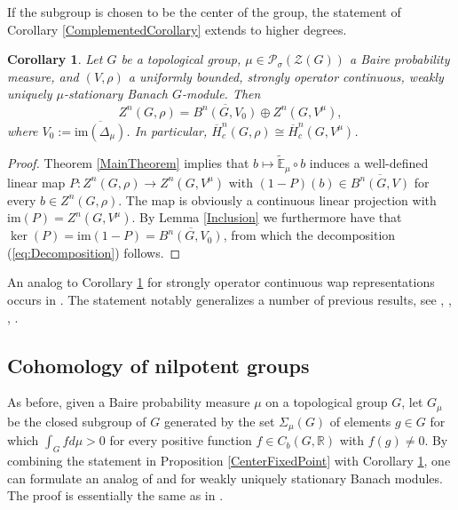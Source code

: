 \documentclass[a4paper,11pt,reqno]{amsart}
\numberwithin{equation}{section}
\newtheorem{corollary}[theorem]{Corollary}
\theoremstyle{definition}
\theoremstyle{remark}
\theoremstyle{remark}
\begin{document}
If the subgroup is chosen to be the center of the group, the statement of Corollary \ref{ComplementedCorollary} extends to higher degrees.

\begin{corollary} \label{AbelianComplementedCorollary} Let $G$ be a topological group, $\mu\in\mathcal{P}_{\sigma}(\mathcal{Z}(G))$ a Baire probability measure, and $(V,\rho)$ a uniformly bounded, strongly operator continuous, weakly uniquely $\mu$-stationary Banach $G$-module. Then 
\begin{equation}
Z^{n}(G,\rho)=\overline{B^{n}(G,V_{0})}\oplus Z^{n}(G,V^{\mu}),\label{eq:Decomposition}
\end{equation}
where \emph{$V_{0}:=\overline{\text{im}(\Delta_{\mu})}$}. In particular, $\overline{H}_{c}^{n}(G,\rho)\cong\overline{H}_{c}^{n}(G,V^{\mu})$. \end{corollary}

\begin{proof} Theorem \ref{MainTheorem} implies that $b\mapsto\widetilde{\mathbb{E}}_{\mu}\circ b$ induces a well-defined linear map $P:Z^{n}(G,\rho)\rightarrow Z^{n}(G,V^{\mu})$ with $(1-P)(b)\in\overline{B^{n}(G,V)}$ for every $b\in Z^{n}(G,\rho)$. The map is obviously a continuous linear projection with $\text{im}(P)=Z^{n}(G,V^{\mu})$. By Lemma \ref{Inclusion} we furthermore have that $\ker(P)=\text{im}(1-P)=\overline{B^{n}(G,V_{0})}$, from which the decomposition (\ref{eq:Decomposition}) follows. \end{proof}

An analog to Corollary \ref{AbelianComplementedCorollary} for strongly operator continuous wap representations occurs in \cite[Corollary 5]{BaderRosendalSauer}. The statement notably generalizes a number of previous results, see \cite{Puls03}, \cite{MartinValette07}, \cite{Kappos05}, \cite{Nowak13}.

\vspace{3mm}


\subsection{Cohomology of nilpotent groups}

As before, given a Baire probability measure $\mu$ on a topological group $G$, let $G_{\mu}$ be the closed subgroup of $G$ generated by the set $\Sigma_{\mu}(G)$ of elements $g\in G$ for which $\int_{G}fd\mu>0$ for every positive function $f\in C_{b}(G,\mathbb{R})$ with $f(g)\neq0$. By combining the statement in Proposition \ref{CenterFixedPoint} with Corollary \ref{AbelianComplementedCorollary}, one can formulate an analog of \cite[Corollary 3.7]{Shalom00} and \cite[Theorem 7]{BaderRosendalSauer} for weakly uniquely stationary Banach modules. The proof is essentially the same as in \cite[Theorem 7]{BaderRosendalSauer}.
\end{document}

